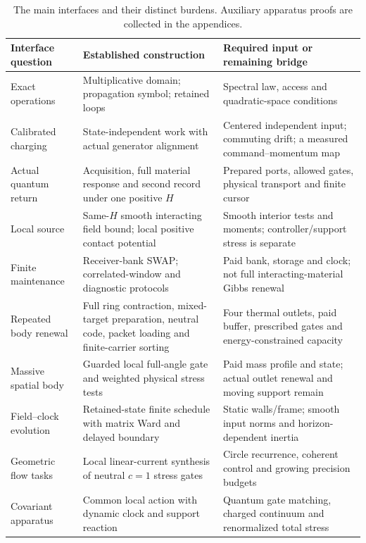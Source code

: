 \begin{table}[!htbp]
\centering\small
\begin{tabular}{@{}P{.23\linewidth}P{.34\linewidth}P{.35\linewidth}@{}}
\toprule
Interface question & Established construction & Required input or remaining bridge\\
\midrule
Exact operations & Multiplicative domain; propagation symbol; retained loops
& Spectral law, access and quadratic-space conditions\\
Calibrated charging & State-independent work with actual generator alignment
& Centered independent input; commuting drift; a measured command--momentum map\\
Actual quantum return & Acquisition, full material response and second record under one positive $H$
& Prepared ports, allowed gates, physical transport and finite cursor\\
Local source & Same-$H$ smooth interacting field bound; local positive contact potential
& Smooth interior tests and moments; controller/support stress is separate\\
Finite maintenance & Receiver-bank SWAP; correlated-window and diagnostic protocols
& Paid bank, storage and clock; not full interacting-material Gibbs renewal\\
Repeated body renewal & Full ring contraction, mixed-target preparation, neutral code, packet loading and finite-carrier sorting
& Four thermal outlets, paid buffer, prescribed gates and energy-constrained capacity\\
Massive spatial body & Guarded local full-angle gate and weighted physical stress tests
& Paid mass profile and state; actual outlet renewal and moving support remain\\
Field--clock evolution & Retained-state finite schedule with matrix Ward and delayed boundary
& Static walls/frame; smooth input norms and horizon-dependent inertia\\
Geometric flow tasks & Local linear-current synthesis of neutral $c=1$ stress gates
& Circle recurrence, coherent control and growing precision budgets\\
Covariant apparatus & Common local action with dynamic clock and support reaction
& Quantum gate matching, charged continuum and renormalized total stress\\
\bottomrule
\end{tabular}
\caption{The main interfaces and their distinct burdens. Auxiliary
apparatus proofs are collected in the appendices.}
\label{tab:status}
\end{table}

